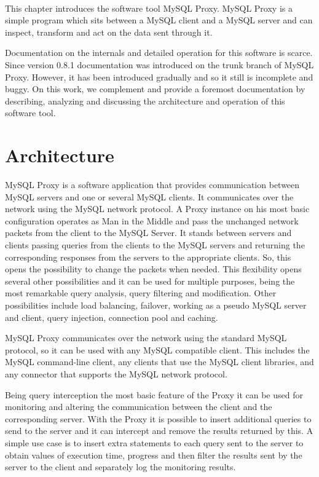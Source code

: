 \paragraph{}

This chapter introduces the software tool MySQL Proxy. MySQL Proxy is a simple program which sits between a MySQL client and a MySQL server and
can inspect, transform and act on the data sent through it.

Documentation on the internals and detailed operation for this software is scarce. Since version 0.8.1 documentation was introduced on the trunk branch of MySQL Proxy. However, it has been introduced gradually and so it still is incomplete and buggy. On this work, we complement and provide a foremost documentation by describing, analyzing and discussing the architecture and operation of this software tool.

\section{Architecture}

\nocite{mysqlproxy}

MySQL Proxy is a software application that provides communication between MySQL servers and one or several MySQL clients. It communicates over the network 
using the MySQL network protocol.
A Proxy instance on his most basic configuration operates as Man in the Middle and pass the unchanged network packets from the client to the MySQL Server. It stands between servers and clients passing queries from the clients to the MySQL servers and returning the corresponding responses from the servers to the appropriate clients. So, this opens the possibility to change the packets when needed.
This flexibility opens several other possibilities and it can be used for multiple purposes, being the most remarkable query analysis, query filtering and modification. Other possibilities include load balancing, failover, working as a pseudo MySQL server and client, query injection, connection pool and caching.

MySQL Proxy communicates over the network using the standard MySQL protocol, so it can be used with any MySQL compatible client. This includes the MySQL command-line client, any clients that use the MySQL client libraries, and any connector that supports the MySQL network protocol.

Being query interception the most basic feature of the Proxy it can be used for monitoring and altering the communication between the client and the corresponding server.
With the Proxy it is possible to insert additional queries to send to the server and it can intercept and remove the results returned by this. A simple use case is to insert extra statements to each query sent to the server to obtain values of execution time, progress and then filter the results sent by the server to the client and separately log the monitoring results. 


